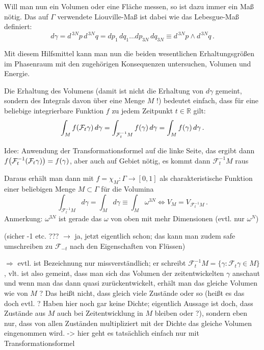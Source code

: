\documentclass[../class_mech_main.tex]{subfiles}
\begin{document}
Will man nun ein Volumen oder eine Fläche messen, so ist dazu immer ein Maß nötig. Das auf $\Gamma$ verwendete Liouville-Maß ist dabei wie das Lebesgue-Maß definiert:
\begin{equation}
d\gamma = d^{\,3N}p \, d^{\,3N}q = dp_1 \, dq_1 \dots dp_{3N} \, dq_{3N} \equiv d^{\,3N}p \wedge d^{\,3N}q \, .
\end{equation}

Mit diesem Hilfsmittel kann man nun die beiden wesentlichen Erhaltungsgrößen im Phasenraum mit den zugehörigen Konsequenzen untersuchen, Volumen und Energie.

Die Erhaltung des Volumens (damit ist nicht die Erhaltung von $d\gamma$ gemeint, sondern des Integrals davon über eine Menge $M$ !) bedeutet einfach, dass für eine beliebige integrierbare Funktion $f$ zu jedem Zeitpunkt $t \in \mathbb{R}$ gilt:
\begin{equation}\label{eq:zeitentw}
\int_M f\qty(\mathcal{F}_t \gamma) \, d\gamma = \int_{\mathcal{F}_t^{-1} M} f\qty(\gamma) \, d\gamma = \int_M f(\gamma) \, d\gamma \, .
\end{equation}

Idee: Anwendung der Transformationsformel auf die linke Seite, das ergibt dann $f\qty(\mathcal{F}_t^{-1}(\mathcal{F}_t \gamma)) = f(\gamma)$, aber auch auf Gebiet nötig, es kommt dann $\mathcal{F}_t^{-1}M$ raus


Daraus erhält man dann mit $f = \chi_M: \Gamma \rightarrow [0,1]$ als charakteristische Funktion einer beliebigen Menge $M \subset \Gamma$ für die Volumina
\begin{equation}
\int_{\mathcal{F}_t^{-1} M} d\gamma = \int_M d\gamma  \equiv \int_M \omega^{3N} \Leftrightarrow V_M = V_{\mathcal{F}_t^{-1}M} \, .
\end{equation}
Anmerkung: $\omega^{3N}$ ist gerade das $\omega$ von oben mit mehr Dimensionen (evtl. nur $\omega^N$)

(sicher -1 etc. ??? $\rightarrow$ ja, jetzt eigentlich schon; das kann man zudem safe umschreiben zu $\mathcal{F}_{-t}$ nach den Eigenschaften von Flüssen)

$\Rightarrow$ evtl. ist Bezeichnung nur missverständlich; er schreibt $\mathcal{F}_t^{-1}M = \{\gamma: \mathcal{F}_t \gamma \in M\}$, vlt. ist also gemeint, dass man sich das Volumen der zeitentwickelten $\gamma$ anschaut und wenn man das dann quasi zurückentwickelt, erhält man das gleiche Volumen wie von $M$ ? Das heißt nicht, dass gleich viele Zustände oder so (heißt es das doch evtl. ? Haben hier noch gar keine Dichte; eigentlich Aussage ist doch, dass Zustände aus $M$ auch bei Zeitentwicklung in $M$ bleiben oder ?), sondern eben nur, dass von allen Zuständen multipliziert mit der Dichte das gleiche Volumen eingenommen wird.
-> hier geht es tatsächlich einfach nur mit Transformationsformel
\end{document}
